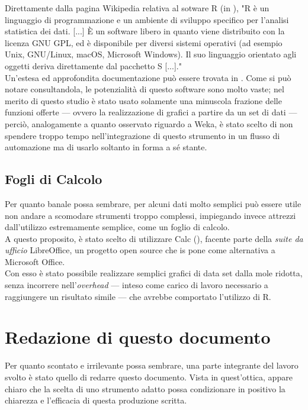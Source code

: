         Direttamente dalla pagina Wikipedia relativa al sotware R (in \cite{Rwiki}), "R è un linguaggio di programmazione e un ambiente di sviluppo specifico per l'analisi statistica dei dati. [...] È un software libero in quanto viene distribuito con la licenza GNU GPL, ed è disponibile per diversi sistemi operativi (ad esempio Unix, GNU/Linux, macOS, Microsoft Windows). Il suo linguaggio orientato agli oggetti deriva direttamente dal pacchetto S [...]." \\

        Un'estesa ed approfondita documentazione può essere trovata in \cite{R}. Come si può notare consultandola, le potenzialità di questo software sono molto vaste; nel merito di questo studio è stato usato solamente una minuscola frazione delle funzioni offerte --- ovvero la realizzazione di grafici a partire da un set di dati --- perciò, analogamente a quanto osservato riguardo a Weka, è stato scelto di non spendere troppo tempo nell'integrazione di questo strumento in un flusso di automazione ma di usarlo soltanto in forma a sé stante.\\

    \subsection{Fogli di Calcolo}

    Per quanto banale possa sembrare, per alcuni dati molto semplici può essere utile non andare a scomodare strumenti troppo complessi, impiegando invece attrezzi dall'utilizzo estremamente semplice, come un foglio di calcolo. \\

    A questo proposito, è stato scelto di utilizzare Calc (\cite{calc}), facente parte della \textit{suite da ufficio} LibreOffice, un progetto open source che is pone come alternativa a Microsoft Office. \\

    Con esso è stato possibile realizzare semplici grafici di data set dalla mole ridotta, senza incorrere nell'\textit{overhead} --- inteso come carico di lavoro necessario a raggiungere un risultato simile --- che avrebbe comportato l'utilizzo di R.

\section{Redazione di questo documento}

    Per quanto scontato e irrilevante possa sembrare, una parte integrante del lavoro svolto è stato quello di redarre questo documento. Vista in quest'ottica, appare chiaro che la scelta di uno strumento adatto possa condizionare in positivo la chiarezza e l'efficacia di questa produzione scritta. \\

